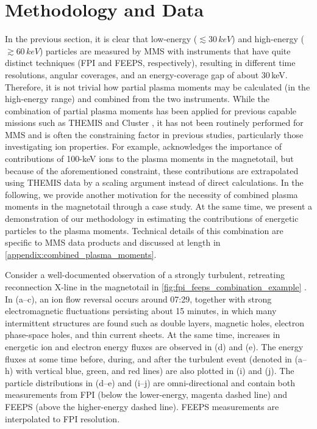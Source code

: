 \documentclass[draft]{agujournal2019}
\begin{document}
\section{Methodology and Data}\label{sec:method}

In the previous section, it is clear that low-energy ($\lesssim30\,\si{keV}$) and high-energy ($\gtrsim60\,\si{keV}$) particles are measured by MMS with instruments that have quite distinct techniques (FPI and FEEPS, respectively), resulting in different time resolutions, angular coverages, and an energy-coverage gap of about 30\,\si{keV}. Therefore, it is not trivial how partial plasma moments may be calculated (in the high-energy range) and combined from the two instruments. While the combination of partial plasma moments has been applied for previous capable missions such as THEMIS \cite{Angelopoulos2008,Hietala2015,Shustov2019} and Cluster \cite{Haaland2010}, it has not been routinely performed for MMS and is often the constraining factor in previous studies, particularly those investigating ion properties. For example,  acknowledges the importance of contributions of 100-\si{keV} ions to the plasma moments in the magnetotail, but because of the aforementioned constraint, these contributions are extrapolated using THEMIS data by a scaling argument instead of direct calculations. In the following, we provide another motivation for the necessity of combined plasma moments in the magnetotail through a case study. At the same time, we present a demonstration of our methodology in estimating the contributions of energetic particles to the plasma moments. Technical details of this combination are specific to MMS data products and discussed at length in \ref{appendix:combined_plasma_moments}. 

Consider a well-documented observation of a strongly turbulent, retreating reconnection X-line in the magnetotail in \cref{fig:fpi_feeps_combination_example} \cite{Ergun2018,Ergun2020a,Ergun2020b}. In (a--c), an ion flow reversal occurs around 07:29, together with strong electromagnetic fluctuations persisting about 15 minutes, in which many intermittent structures are found such as double layers, magnetic holes, electron phase-space holes, and thin current sheets. At the same time, increases in energetic ion and electron energy fluxes are observed in (d) and (e). The energy fluxes at some time before, during, and after the turbulent event (denoted in (a--h) with vertical blue, green, and red lines) are also plotted in (i) and (j). The particle distributions in (d--e) and (i--j) are omni-directional and contain both measurements from FPI (below the lower-energy, magenta dashed line) and FEEPS (above the higher-energy dashed line). FEEPS measurements are interpolated to FPI resolution.
\end{document}
